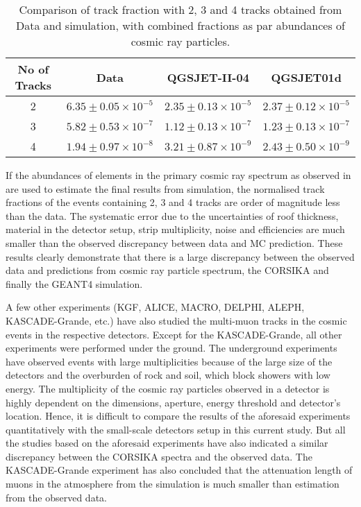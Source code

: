 \begin{table}[btbp]
  \centering
\begin{tabular}{|c|ccc|} \hline
No of Tracks &  Data &   QGSJET-II-04     &  QGSJET01d \\ \hline
    2         & $6.35\pm 0.05\times 10^{-5}$ & $2.35\pm 0.13\times 10^{-5}$ & $2.37\pm 0.12\times 10^{-5}$ \\
    3         & $5.82\pm 0.53\times 10^{-7}$ & $1.12\pm 0.13\times 10^{-7}$ & $1.23\pm 0.13\times 10^{-7}$ \\
    4         & $1.94\pm 0.97\times 10^{-8}$ & $3.21\pm 0.87\times 10^{-9}$ & $2.43\pm 0.50\times 10^{-9}$ \\ \hline
\end{tabular}
\caption{Comparison of track fraction with 2, 3 and 4 tracks
  obtained from Data and simulation, with combined fractions
  as par abundances of cosmic ray particles.}\label{tab:ratio2}
\end{table}

If the abundances of elements in the primary cosmic ray spectrum as
observed in \cite{cosmic1,pdgspectra1} are used to estimate the final
results from simulation, the normalised track fractions of the events
containing 2, 3 and 4 tracks are order of magnitude less than
the data. The systematic error due to the uncertainties of roof
thickness, material in the detector setup, strip multiplicity, noise
and efficiencies are much smaller than the observed discrepancy
between data and MC prediction. These results clearly demonstrate
that there is a large discrepancy between the observed data and 
predictions from cosmic ray particle spectrum, the CORSIKA and
finally the GEANT4 simulation.

A few other experiments (KGF\cite{kgf1}, ALICE\cite{alice1},
MACRO\cite{macro1}, DELPHI\cite{delphi1}, ALEPH\cite{aleph1},
KASCADE-Grande\cite{kascade1}, etc.) have also studied the multi-muon
tracks in the cosmic events in the respective detectors. Except for
the KASCADE-Grande, all other experiments were performed under
the ground. The underground experiments have observed events with
large multiplicities because of the large size of the detectors and
the overburden of rock and soil, which block showers with low energy.
The multiplicity of the cosmic ray particles observed in a detector
is highly dependent on the dimensions, aperture, energy threshold
and detector's location. Hence, it is difficult to compare the
results of the aforesaid experiments quantitatively with the
small-scale detectors setup in this current study. But all
the studies based on the aforesaid experiments have also indicated
a similar discrepancy between the CORSIKA spectra and the observed
data. The KASCADE-Grande experiment has also concluded that the
attenuation length of muons in the atmosphere from the simulation
is much smaller than estimation from the observed data\cite{kascade1}.

